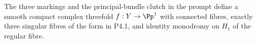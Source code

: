 
\begin{proposition}[P4.2]\hypertarget{tag-02WR}{}\label{night:P4.2}\label{stmt:P4.2}


The three markings and the principal-bundle clutch in the prompt define a
smooth compact complex threefold $f:Y\to\Pp^1$ with connected fibres,
exactly three singular fibres of the form in P4.1, and identity monodromy
on $H_1$ of the regular fibre.
\end{proposition}

